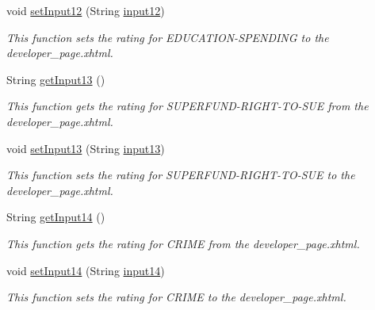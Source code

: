 \begin{DoxyCompactItemize}
void \hyperlink{classorg_1_1jboss_1_1as_1_1quickstarts_1_1greeter_1_1web_1_1_general_controller_ac43a70ac95773247077bfdb16fef7634}{set\+Input12} (String \hyperlink{classorg_1_1jboss_1_1as_1_1quickstarts_1_1greeter_1_1web_1_1_general_controller_a3d2ab84e219ad0f48f7a7ff1bc7ab06b}{input12})
\begin{DoxyCompactList}\small\item\em This function sets the rating for E\+D\+U\+C\+A\+T\+I\+O\+N-\/\+S\+P\+E\+N\+D\+I\+NG to the developer\+\_\+page.\+xhtml. \end{DoxyCompactList}\item 
String \hyperlink{classorg_1_1jboss_1_1as_1_1quickstarts_1_1greeter_1_1web_1_1_general_controller_af649b9e889e4918d3f86e255b796e82a}{get\+Input13} ()
\begin{DoxyCompactList}\small\item\em This function gets the rating for S\+U\+P\+E\+R\+F\+U\+N\+D-\/\+R\+I\+G\+H\+T-\/\+T\+O-\/\+S\+UE from the developer\+\_\+page.\+xhtml. \end{DoxyCompactList}\item 
void \hyperlink{classorg_1_1jboss_1_1as_1_1quickstarts_1_1greeter_1_1web_1_1_general_controller_add9e7b828b28daac292b9db1bceb2315}{set\+Input13} (String \hyperlink{classorg_1_1jboss_1_1as_1_1quickstarts_1_1greeter_1_1web_1_1_general_controller_a027de7ab9f17d18e29161d2f54c8e6fc}{input13})
\begin{DoxyCompactList}\small\item\em This function sets the rating for S\+U\+P\+E\+R\+F\+U\+N\+D-\/\+R\+I\+G\+H\+T-\/\+T\+O-\/\+S\+UE to the developer\+\_\+page.\+xhtml. \end{DoxyCompactList}\item 
String \hyperlink{classorg_1_1jboss_1_1as_1_1quickstarts_1_1greeter_1_1web_1_1_general_controller_ab872aa0640056b4825cb4ff73dadb1b1}{get\+Input14} ()
\begin{DoxyCompactList}\small\item\em This function gets the rating for C\+R\+I\+ME from the developer\+\_\+page.\+xhtml. \end{DoxyCompactList}\item 
void \hyperlink{classorg_1_1jboss_1_1as_1_1quickstarts_1_1greeter_1_1web_1_1_general_controller_a652b82061739ac7de0bee60b9dfd53f5}{set\+Input14} (String \hyperlink{classorg_1_1jboss_1_1as_1_1quickstarts_1_1greeter_1_1web_1_1_general_controller_a2b454987098aeb5ad2ea9345fa7e9f53}{input14})
\begin{DoxyCompactList}\small\item\em This function sets the rating for C\+R\+I\+ME to the developer\+\_\+page.\+xhtml. \end{DoxyCompactList}\item 

\end{DoxyCompactItemize}
